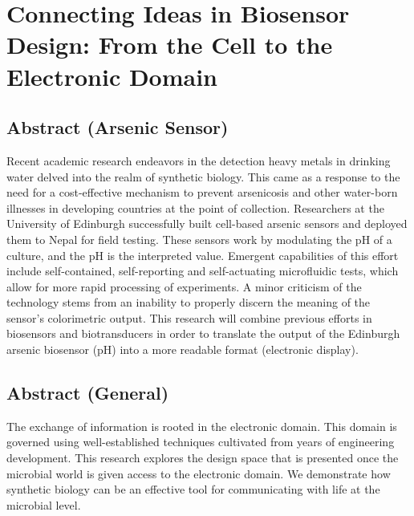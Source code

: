 \documentclass[11pt,journal,compsoc, onecolumn]{IEEEtran}
\begin{document}
\section{Connecting Ideas in Biosensor Design: From the Cell to the Electronic Domain}
\subsection{Abstract (Arsenic Sensor)}
Recent academic research endeavors in the detection heavy metals in drinking water delved into the realm of synthetic biology. This came as a response to the need
for a cost-effective mechanism to prevent arsenicosis and other water-born illnesses in developing countries
at the point of collection. Researchers at the University of
Edinburgh successfully built cell-based arsenic sensors and deployed them to
Nepal for field testing. These sensors work by modulating the pH of a culture, and the pH is the interpreted value. Emergent
capabilities of this effort include self-contained, self-reporting and
self-actuating microfluidic tests, which allow for more rapid processing of
experiments. 
A minor criticism of the technology stems from  
an inability to properly discern the meaning of the sensor's colorimetric
output. This research will combine previous efforts in biosensors and
biotransducers in order to translate the output of the Edinburgh arsenic
biosensor (pH) into a more readable format (electronic display). 
\subsection{Abstract (General)}
 The exchange of information is rooted in the electronic domain. This domain is governed using well-established techniques cultivated from years of engineering development. This research explores the design space that is presented once the microbial world is given access to the electronic domain. We demonstrate how synthetic biology can be an effective tool for communicating with life at the microbial level.
\end{document}
